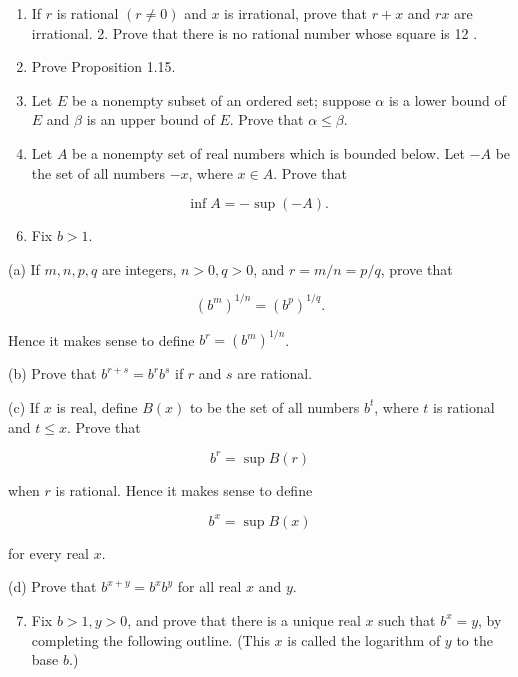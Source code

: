 \documentclass[10pt]{article}
\begin{document}
\begin{enumerate}
  \item If $r$ is rational $(r \neq 0)$ and $x$ is irrational, prove that $r+x$ and $r x$ are irrational. 2. Prove that there is no rational number whose square is 12 .

  \item Prove Proposition 1.15.

  \item Let $E$ be a nonempty subset of an ordered set; suppose $\alpha$ is a lower bound of $E$ and $\beta$ is an upper bound of $E$. Prove that $\alpha \leq \beta$.

  \item Let $A$ be a nonempty set of real numbers which is bounded below. Let $-A$ be the set of all numbers $-x$, where $x \in A$. Prove that

\end{enumerate}

$$
\inf A=-\sup (-A) \text {. }
$$

\begin{enumerate}
  \setcounter{enumi}{5}
  \item Fix $b>1$.
\end{enumerate}

(a) If $m, n, p, q$ are integers, $n>0, q>0$, and $r=m / n=p / q$, prove that

$$
\left(b^{m}\right)^{1 / n}=\left(b^{p}\right)^{1 / q} .
$$

Hence it makes sense to define $b^{r}=\left(b^{m}\right)^{1 / n}$.

(b) Prove that $b^{r+s}=b^{r} b^{s}$ if $r$ and $s$ are rational.

(c) If $x$ is real, define $B(x)$ to be the set of all numbers $b^{t}$, where $t$ is rational and $t \leq x$. Prove that

$$
b^{r}=\sup B(r)
$$

when $r$ is rational. Hence it makes sense to define

$$
b^{x}=\sup B(x)
$$

for every real $x$.

(d) Prove that $b^{x+y}=b^{x} b^{y}$ for all real $x$ and $y$.

\begin{enumerate}
  \setcounter{enumi}{6}
  \item Fix $b>1, y>0$, and prove that there is a unique real $x$ such that $b^{x}=y$, by completing the following outline. (This $x$ is called the logarithm of $y$ to the base $b$.)
\end{enumerate}
\end{document}
